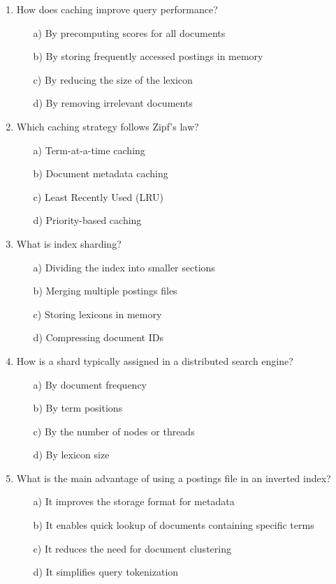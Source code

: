 \documentclass[8pt]{extarticle}
\begin{document}
\begin{multicols}{2}
\begin{enumerate}
\item How does caching improve query performance?
\begin{itemize}
\item[a)] By precomputing scores for all documents
\item[b)] By storing frequently accessed postings in memory
\item[c)] By reducing the size of the lexicon
\item[d)] By removing irrelevant documents
\end{itemize}

\item Which caching strategy follows Zipf's law?
\begin{itemize}
\item[a)] Term-at-a-time caching
\item[b)] Document metadata caching
\item[c)] Least Recently Used (LRU)
\item[d)] Priority-based caching
\end{itemize}

\item What is index sharding?
\begin{itemize}
\item[a)] Dividing the index into smaller sections
\item[b)] Merging multiple postings files
\item[c)] Storing lexicons in memory
\item[d)] Compressing document IDs
\end{itemize}

\item How is a shard typically assigned in a distributed search engine?
\begin{itemize}
\item[a)] By document frequency
\item[b)] By term positions
\item[c)] By the number of nodes or threads
\item[d)] By lexicon size
\end{itemize}

\item What is the main advantage of using a postings file in an inverted index?
\begin{itemize}
\item[a)] It improves the storage format for metadata
\item[b)] It enables quick lookup of documents containing specific terms
\item[c)] It reduces the need for document clustering
\item[d)] It simplifies query tokenization
\end{itemize}


\end{enumerate}
\end{multicols}
\end{document}
